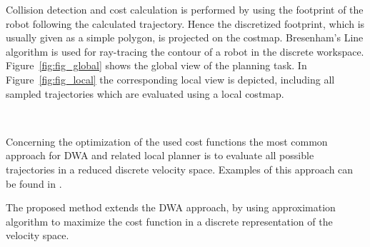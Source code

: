 Collision detection and cost calculation is performed by using the footprint of the robot following the calculated trajectory.
Hence the discretized footprint, which is usually given as a simple polygon, is projected on the costmap. 
Bresenham's Line algorithm \cite{bresenham1965algorithm} is used for ray-tracing the contour of a robot in the discrete workspace. 
Figure~\ref{fig:fig_global} shows the global view of the planning task. 
In Figure~\ref{fig:fig_local} the corresponding local view is depicted, including all sampled trajectories which are evaluated using a local costmap.

\begin{figure}[thpb]
	  \myfloatalign
      \footnotesize
      \centering
     \\    
   \caption[]{}
   \label{fig:fig_dwa}
\end{figure}

Concerning the optimization of the used cost functions the most common approach for DWA and related local planner is to evaluate all possible trajectories in a reduced discrete velocity space. 
Examples of this approach can be found in \cite{kiss2012advanced}\cite{DBLP:conf/icra/Marder-EppsteinBFGK10}\cite{conf/icra/SederP07}. 

The proposed method extends the DWA approach, by using approximation algorithm to maximize the cost function in a discrete representation of the velocity space.





